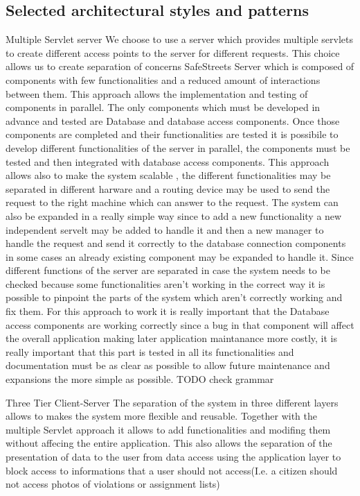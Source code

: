 \subsection{Selected architectural styles and patterns}
Multiple Servlet server
\newline
We choose to use a server which provides multiple servlets to create different access points to the server for different requests. This choice allows us to create separation of concerns SafeStreets Server which is composed of components with few functionalities and a reduced amount of interactions between them. This approach allows the implementation and testing of components in parallel. The only components which must be developed in advance and tested are Database and database access components. Once those components  are completed  and their functionalities are tested it is possibile to develop different functionalities of the server in parallel, the components must be tested and then integrated with database access components. This approach allows also to make the system scalable , the different functionalities may be separated in different harware and a routing device may be used to send the request to the right machine which can answer to the request. The system can also be expanded in a really simple way since to add a new functionality a new independent servelt may be added to handle it and then a new manager to handle the request and send it correctly to the database connection components in some cases an  already existing component may be expanded to handle it.
Since different functions of the server are separated in case the system needs to be checked because some functionalities aren't working in the correct way it is possible to pinpoint the parts of the system which aren't correctly working and fix them. For this approach to work it is really important that the Database access components are working correctly since a bug in that component will affect the overall application making later application maintanance more costly, it is really important that this part is tested in all its functionalities and documentation must be as clear as possible to allow future maintenance and expansions the more simple as possible.
TODO check grammar

Three Tier Client-Server
\newline
The separation of the system in three different layers allows to makes the system more flexible and reusable.
Together with the multiple Servlet approach it allows to add functionalities and modifing them without affecing the entire application.
This also allows the separation of the presentation of data to the user from data access using the application layer to block access to informations that a user should not access(I.e. a citizen should not access photos of violations or assignment lists)

